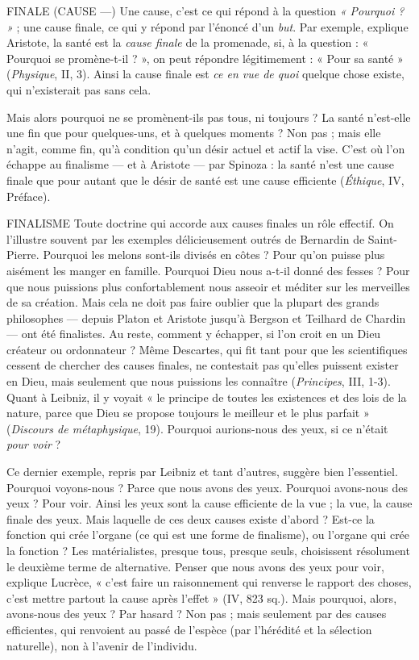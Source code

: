 FINALE (CAUSE —) Une cause, c’est ce qui répond à la question {\it « Pourquoi ? »} ;
une cause finale, ce qui y répond par l’énoncé
d’un {\it but}. Par exemple, explique Aristote, la santé est la {\it cause finale} de la promenade,
si, à la question : « Pourquoi se promène-t-il ? », on peut répondre
légitimement : « Pour sa santé » ({\it Physique}, II, 3). Ainsi la cause finale est {\it ce en
vue de quoi} quelque chose existe, qui n’existerait pas sans cela.

Mais alors pourquoi ne se promènent-ils pas tous, ni toujours ? La santé
n'est-elle une fin que pour quelques-uns, et à quelques moments ? Non pas ;
mais elle n’agit, comme fin, qu’à condition qu’un désir actuel et actif la vise.
C’est où l’on échappe au finalisme — et à Aristote — par Spinoza : la santé n’est
une cause finale que pour autant que le désir de santé est une cause efficiente
({\it Éthique}, IV, Préface).

FINALISME Toute doctrine qui accorde aux causes finales un rôle effectif.
On l’illustre souvent par les exemples délicieusement outrés de
Bernardin de Saint-Pierre. Pourquoi les melons sont-ils divisés en côtes ? Pour
qu’on puisse plus aisément les manger en famille. Pourquoi Dieu nous a-t-il
donné des fesses ? Pour que nous puissions plus confortablement nous asseoir
et méditer sur les merveilles de sa création. Mais cela ne doit pas faire oublier
que la plupart des grands philosophes — depuis Platon et Aristote jusqu’à
Bergson et Teilhard de Chardin — ont été finalistes. Au reste, comment y
échapper, si l’on croit en un Dieu créateur ou ordonnateur ? Même Descartes,
qui fit tant pour que les scientifiques cessent de chercher des causes finales, ne
contestait pas qu’elles puissent exister en Dieu, mais seulement que nous puissions
les connaître ({\it Principes}, III, 1-3). Quant à Leibniz, il y voyait « le principe
de toutes les existences et des lois de la nature, parce que Dieu se propose toujours
le meilleur et le plus parfait » ({\it Discours de métaphysique}, 19). Pourquoi
aurions-nous des yeux, si ce n’était {\it pour voir} ?

Ce dernier exemple, repris par Leibniz et tant d’autres, suggère bien l’essentiel.
Pourquoi voyons-nous ? Parce que nous avons des yeux. Pourquoi avons-nous
des yeux ? Pour voir. Ainsi les yeux sont la cause efficiente de la vue ; la
vue, la cause finale des yeux. Mais laquelle de ces deux causes existe d’abord ?
Est-ce la fonction qui crée l’organe (ce qui est une forme de finalisme), ou
l'organe qui crée la fonction ? Les matérialistes, presque tous, presque seuls,
choisissent résolument le deuxième terme de alternative. Penser que nous
avons des yeux pour voir, explique Lucrèce, « c’est faire un raisonnement qui
renverse le rapport des choses, c’est mettre partout la cause après l’effet » (IV,
823 sq.). Mais pourquoi, alors, avons-nous des yeux ? Par hasard ? Non pas ;
mais seulement par des causes efficientes, qui renvoient au passé de l’espèce
(par l’hérédité et la sélection naturelle), non à l’avenir de l’individu.

